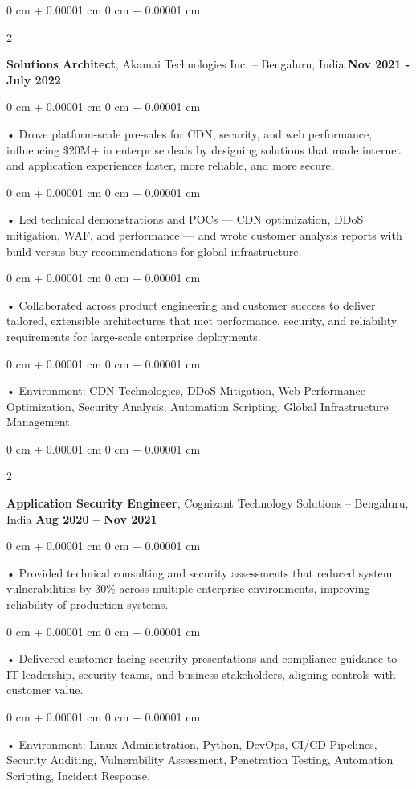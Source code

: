 \documentclass[10pt, letterpaper]{article}
\newenvironment{onecolentry}{
    \begin{adjustwidth}{
        0 cm + 0.00001 cm
    }{
        0 cm + 0.00001 cm
    }
}{
    \end{adjustwidth}
} %
\newenvironment{twocolentry}[2][]{
    \onecolentry
    \def\secondColumn{#2}
    \setcolumnwidth{\fill, 4.5 cm}
    \begin{paracol}{2}
}{
    \switchcolumn \raggedleft \secondColumn
    \end{paracol}
    \endonecolentry
} %
\begin{document}
        \begin{twocolentry}{
            \textbf{Nov 2021 - July 2022}
        }
            \textbf{Solutions Architect}, Akamai Technologies Inc. -- Bengaluru, India \end{twocolentry}
        \begin{onecolentry}
            • Drove platform-scale pre-sales for CDN, security, and web performance, influencing \$20M+ in enterprise deals by designing solutions that made internet and application experiences faster, more reliable, and more secure.
        \end{onecolentry}
        \begin{onecolentry}
            • Led technical demonstrations and POCs --- CDN optimization, DDoS mitigation, WAF, and performance --- and wrote customer analysis reports with build-versus-buy recommendations for global infrastructure.
        \end{onecolentry}
        \begin{onecolentry}
             • Collaborated across product engineering and customer success to deliver tailored, extensible architectures that met performance, security, and reliability requirements for large-scale enterprise deployments.
        \end{onecolentry}
        \begin{onecolentry}
             • Environment: CDN Technologies, DDoS Mitigation, Web Performance Optimization, Security Analysis, Automation Scripting, Global Infrastructure Management.
        \end{onecolentry}

        \begin{twocolentry}{
            \textbf{Aug 2020 – Nov 2021}
        }
            \vspace{2 pt }
            \textbf{Application Security Engineer}, Cognizant Technology Solutions -- Bengaluru, India\end{twocolentry}
        \begin{onecolentry}
             • Provided technical consulting and security assessments that reduced system vulnerabilities by 30\% across multiple enterprise environments, improving reliability of production systems.
        \end{onecolentry}
        \begin{onecolentry}
             • Delivered customer-facing security presentations and compliance guidance to IT leadership, security teams, and business stakeholders, aligning controls with customer value.
        \end{onecolentry}
        \begin{onecolentry}
             • Environment: Linux Administration, Python, DevOps, CI/CD Pipelines, Security Auditing, Vulnerability Assessment, Penetration Testing, Automation Scripting, Incident Response.
        \end{onecolentry}
    \vspace{2 pt }
\end{document}
